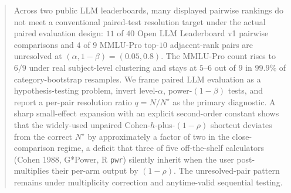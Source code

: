 \documentclass{article}
\theoremstyle{plain}
\theoremstyle{definition}
\begin{document}

\printAffiliationsAndNotice{}


\raggedbottom

\setlength{\textfloatsep}{0pt plus 1pt minus 0pt}
\setlength{\floatsep}{0pt plus 1pt minus 0pt}
\setlength{\intextsep}{0pt plus 1pt minus 0pt}
\setlength{\dbltextfloatsep}{0pt plus 1pt minus 0pt}
\setlength{\dblfloatsep}{0pt plus 1pt minus 0pt}
\setlength{\abovecaptionskip}{2pt}
\setlength{\belowcaptionskip}{2pt}

\begin{abstract}
Across two public LLM leaderboards, many displayed pairwise rankings do not meet a conventional paired-test resolution target under the actual paired evaluation design: $11$ of $40$ Open LLM Leaderboard v1 pairwise comparisons and $4$ of $9$ MMLU-Pro top-$10$ adjacent-rank pairs are unresolved at $(\alpha,1{-}\beta){=}(0.05,0.8)$. The MMLU-Pro count rises to $6/9$ under real subject-level clustering and stays at $5$--$6$ out of $9$ in $99.9\%$ of category-bootstrap resamples. We frame paired LLM evaluation as a hypothesis-testing problem, invert level-$\alpha$, power-$(1{-}\beta)$ tests, and report a per-pair resolution ratio $q{=}N/N^{\star}$ as the primary diagnostic. A sharp small-effect expansion with an explicit second-order constant shows that the widely-used unpaired Cohen-$h$-plus-$(1{-}\rho)$ shortcut deviates from the correct $N^{\star}$ by approximately a factor of two in the close-comparison regime, a deficit that three of five off-the-shelf calculators (Cohen 1988, G*Power, R \texttt{pwr}) silently inherit when the user post-multiplies their per-arm output by $(1{-}\rho)$. The unresolved-pair pattern remains under multiplicity correction and anytime-valid sequential testing.
\end{abstract}
\end{document}
